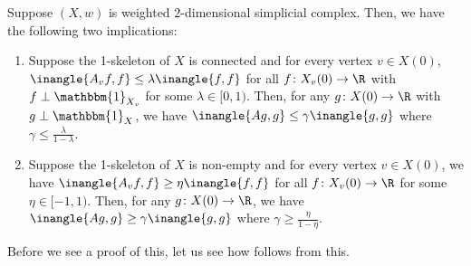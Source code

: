 \documentclass{toc}
\begin{document}
\begin{theorem}\label{thm:trickle-down-one-level}
  Suppose $(X,w)$ is weighted $2$-dimensional simplicial complex. Then, we have the following two implications:
  \begin{enumerate}
  \item \label{thm:trickle-down-positive} Suppose the 1-skeleton of
    $X$ is connected and for every vertex $v \in X(0)$,
    $\inangle{A_v f,f} \leq \lambda \inangle{f,f}$ for all $f\colon
    X_v(0) \rightarrow \R$ with $f \perp \mathbbm{1}_{X_v}$ for some
    $\lambda \in [0,1)$. Then, for
    any $g\colon X(0) \rightarrow \R$ with $g \perp \mathbbm{1}_X$, we
have $\inangle{Ag,g} \leq \gamma \inangle{g,g}$ where $\gamma \leq
\frac{\lambda}{1- \lambda}$.
  \item \label{thm:trickle-down-negative} Suppose the 1-skeleton of
    $X$ is non-empty and for every vertex $v \in X(0)$, we have
    $\inangle{A_v f,f} \geq \eta \inangle{f,f}$ for all $f\colon
    X_v(0) \rightarrow \R$ for some $\eta \in [-1,1)$. Then, for any $g\colon X(0) \rightarrow \R$, we
have $\inangle{Ag,g} \geq \gamma \inangle{g,g}$ where $\gamma \geq
\frac{\eta}{1- \eta}$.
\end{enumerate}
  

\end{theorem}

\noindent Before we see a proof of this, let us  see how  follows from this.
\end{document}
